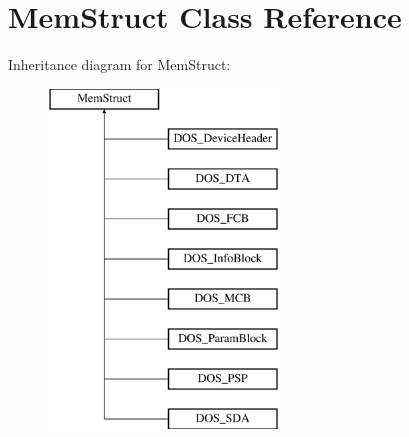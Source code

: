 \hypertarget{classMemStruct}{\section{Mem\-Struct Class Reference}
\label{classMemStruct}
}
Inheritance diagram for Mem\-Struct\-:\begin{figure}[H]
\begin{center}
\leavevmode
\includegraphics[height=9.000000cm]{classMemStruct}
\end{center}
\end{figure}
